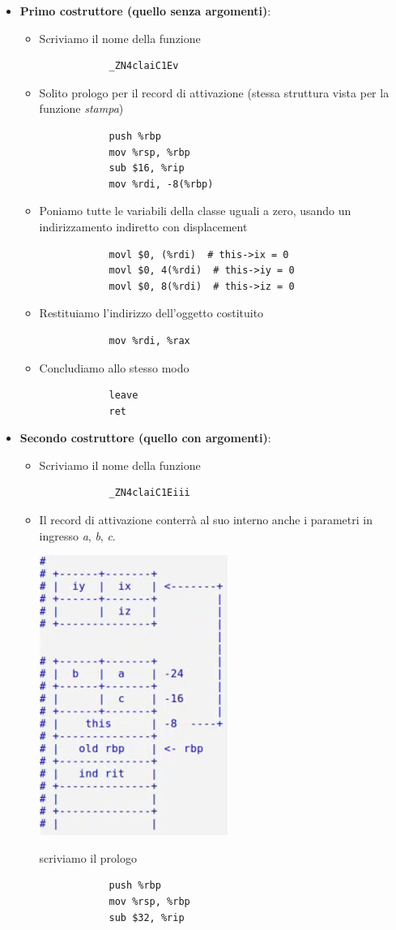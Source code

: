 \begin{itemize}
	\item \textbf{Primo costruttore (quello senza argomenti)}:
	\begin{itemize}
		\item Scriviamo il nome della funzione
		\begin{verbatim}
			_ZN4claiC1Ev
		\end{verbatim}
		\item Solito prologo per il record di attivazione (stessa struttura vista per la funzione \emph{stampa})
		\begin{verbatim}
			push %rbp
			mov %rsp, %rbp
			sub $16, %rip
			mov %rdi, -8(%rbp)
		\end{verbatim}
		\item Poniamo tutte le variabili della classe uguali a zero, usando un indirizzamento indiretto con displacement
		\begin{verbatim}
			movl $0, (%rdi)  # this->ix = 0
			movl $0, 4(%rdi)  # this->iy = 0
			movl $0, 8(%rdi)  # this->iz = 0
		\end{verbatim}
		\item Restituiamo l'indirizzo dell'oggetto costituito
		\begin{verbatim}
			mov %rdi, %rax
		\end{verbatim}
		\item Concludiamo allo stesso modo
		\begin{verbatim}
			leave
			ret
		\end{verbatim}
	\end{itemize}
	\item \textbf{Secondo costruttore (quello con argomenti)}:
	\begin{itemize}
		\item Scriviamo il nome della funzione
		\begin{verbatim}
			_ZN4claiC1Eiii
		\end{verbatim}
		\item Il record di attivazione conterrà al suo interno anche i parametri in ingresso \emph{a}, \emph{b}, \emph{c}.
		\begin{center}
			\includegraphics{img/40.PNG}
		\end{center}  
		scriviamo il prologo
		\begin{verbatim}
			push %rbp
			mov %rsp, %rbp
			sub $32, %rip
			

\end{verbatim}
\end{itemize}
\end{itemize}
